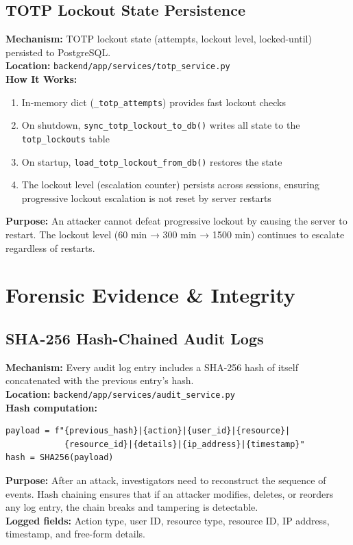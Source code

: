 \documentclass[11pt,a4paper]{article}
\begin{document}
\subsection{TOTP Lockout State Persistence}

\begin{tcolorbox}[colback=recoveryblue!5, colframe=recoveryblue]
\textbf{Mechanism:} TOTP lockout state (attempts, lockout level, locked-until) persisted to PostgreSQL.\\
\textbf{Location:} \texttt{backend/app/services/totp\_service.py}\\
\textbf{How It Works:}
\begin{enumerate}[nosep]
  \item In-memory dict (\texttt{\_totp\_attempts}) provides fast lockout checks
  \item On shutdown, \texttt{sync\_totp\_lockout\_to\_db()} writes all state to the \texttt{totp\_lockouts} table
  \item On startup, \texttt{load\_totp\_lockout\_from\_db()} restores the state
  \item The lockout level (escalation counter) persists across sessions, ensuring progressive lockout escalation is not reset by server restarts
\end{enumerate}
\textbf{Purpose:} An attacker cannot defeat progressive lockout by causing the server to restart. The lockout level (60 min → 300 min → 1500 min) continues to escalate regardless of restarts.
\end{tcolorbox}

\section{Forensic Evidence \& Integrity}

\subsection{SHA-256 Hash-Chained Audit Logs}

\begin{tcolorbox}[colback=recoveryblue!5, colframe=recoveryblue]
\textbf{Mechanism:} Every audit log entry includes a SHA-256 hash of itself concatenated with the previous entry's hash.\\
\textbf{Location:} \texttt{backend/app/services/audit\_service.py}\\
\textbf{Hash computation:}
\begin{verbatim}
payload = f"{previous_hash}|{action}|{user_id}|{resource}|
            {resource_id}|{details}|{ip_address}|{timestamp}"
hash = SHA256(payload)
\end{verbatim}
\textbf{Purpose:} After an attack, investigators need to reconstruct the sequence of events. Hash chaining ensures that if an attacker modifies, deletes, or reorders any log entry, the chain breaks and tampering is detectable.\\
\textbf{Logged fields:} Action type, user ID, resource type, resource ID, IP address, timestamp, and free-form details.
\end{tcolorbox}
\end{document}
